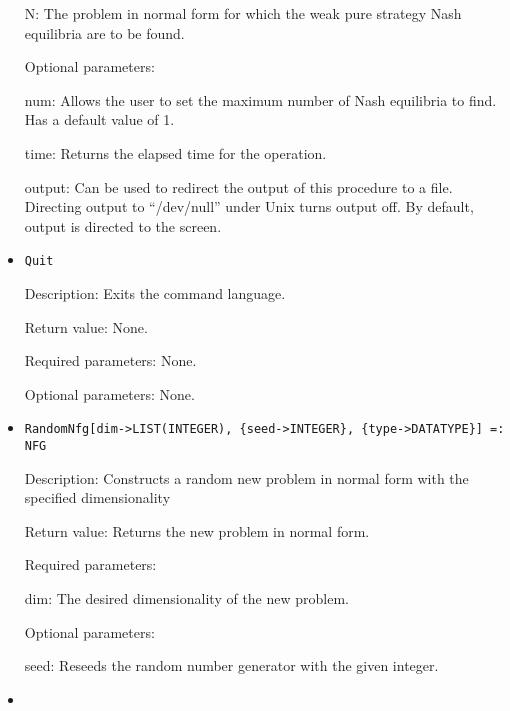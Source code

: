 \begin{itemize}
\bd
\item
[N:] The problem in normal form for which the weak pure strategy Nash
equilibria are to be found.
\ed

\item
[Optional parameters:]\hfil\null
	
\bd
\item
[num:] Allows the user to set the maximum number of Nash equilibria to
find.  Has a default value of 1.
\item
[time:] Returns the elapsed time for the operation.
\item
[output:] Can be used to redirect the output of this procedure to a
file.  Directing output to ``/dev/null'' under Unix turns output off.
By default, output is directed to the screen.

\ed
\ed

\item

\protect \large \begin{verbatim}
Quit
\end{verbatim}\normalsize

\bd

\item
[Description:] Exits the command language.
\item
[Return value:] None.
\item
[Required parameters:] None.
\item
[Optional parameters:] None.
\ed

\item

\protect \large \begin{verbatim}
RandomNfg[dim->LIST(INTEGER), {seed->INTEGER}, {type->DATATYPE}] =:
NFG
\end{verbatim}\normalsize

\bd
\item
[Description:] Constructs a random new problem in normal form with the
specified dimensionality
\item
[Return value:] Returns the new problem in normal form.
\item
[Required parameters:]\hfil\null
	
\bd
\item
[dim:] The desired dimensionality of the new problem.
\ed

\item
[Optional parameters:]\hfil\null
	
\bd
\item
[seed:] Reseeds the random number generator with the given integer.
\item


\end{itemize}
